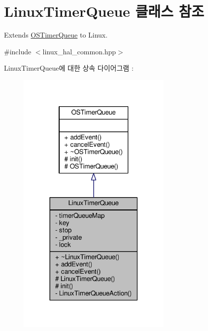 \hypertarget{class_linux_timer_queue}{}\section{Linux\+Timer\+Queue 클래스 참조}
\label{class_linux_timer_queue}


Extends \hyperlink{class_o_s_timer_queue}{O\+S\+Timer\+Queue} to Linux.  




{\ttfamily \#include $<$linux\+\_\+hal\+\_\+common.\+hpp$>$}



Linux\+Timer\+Queue에 대한 상속 다이어그램 \+: 
\nopagebreak
\begin{figure}[H]
\begin{center}
\leavevmode
\includegraphics[width=213pt]{class_linux_timer_queue__inherit__graph}
\end{center}
\end{figure}


